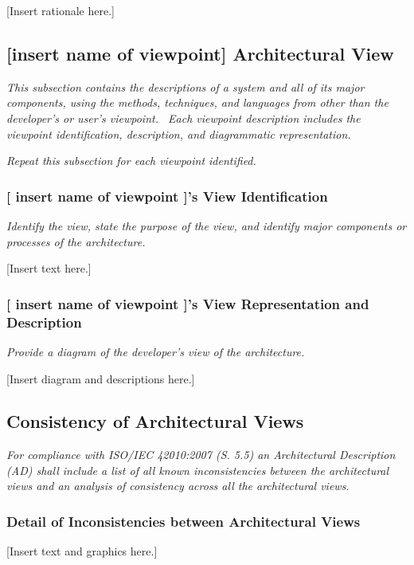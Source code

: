 \documentclass[twoside,letterpaper]{article}
\begin{document}
[Insert rationale here.]

\subsection{[insert name of viewpoint] Architectural View}
{\itshape\color{black}
This subsection contains the descriptions of a system and all of its
major components, using the methods, techniques, and languages from
other than the developer{\textquoteright}s or user{\textquoteright}s
viewpoint. \ Each viewpoint description includes the viewpoint
identification, description, and diagrammatic representation. }

{\itshape\color{black}
Repeat this subsection for each viewpoint identified.}

\subsubsection{[ insert name of viewpoint ]'s View Identification}
{\itshape\color{black}
Identify the view, state the purpose of the view, and identify major
components or processes of the architecture.}

[Insert text here.]

\subsubsection{[ insert name of viewpoint ]'s View Representation and Description}
{\itshape\color{black}
Provide a diagram of the developer{\textquoteright}s view of the
architecture.}

[Insert diagram and descriptions here.]

\subsection{Consistency of Architectural Views}
{\itshape\color{black}
For compliance with ISO/IEC 42010:2007 (S. 5.5) an Architectural
Description (AD) shall include a list of all known inconsistencies
between the architectural views and an analysis of consistency across
all the architectural views.}

\subsubsection{Detail of Inconsistencies between Architectural Views}
{\color{black}
[Insert text and graphics here.]}
\end{document}
